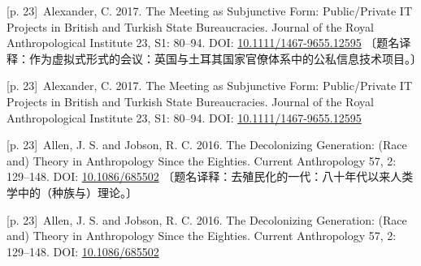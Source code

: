 \documentclass[10pt,a4paper]{article}
\begin{document}
\noindent\begin{minipage}{\textwidth}\begin{minipage}[t]{\dimexpr.5\textwidth-4mm\relax}\noindent\begin{minipage}[t]{\linewidth}{\scriptsize\color{gray} [p. 23]}\ Alexander, C. 2017. The Meeting as Subjunctive Form: Public/Private IT Projects in British and Turkish State Bureaucracies. Journal of the Royal Anthropological Institute 23, S1: 80–94. DOI: \url{10.1111/1467-9655.12595} 〔题名译释：作为虚拟式形式的会议：英国与土耳其国家官僚体系中的公私信息技术项目。〕\par\end{minipage}\par\end{minipage}\hfill\begin{minipage}[t]{\dimexpr.5\textwidth-4mm\relax}\noindent\begin{minipage}[t]{\linewidth}{\scriptsize\color{gray} [p. 23]}\ Alexander, C. 2017. The Meeting as Subjunctive Form: Public/Private IT Projects in British and Turkish State Bureaucracies. Journal of the Royal Anthropological Institute 23, S1: 80–94. DOI: \url{10.1111/1467-9655.12595}\par\end{minipage}\par\end{minipage}\end{minipage}\par
\noindent\begin{minipage}{\textwidth}\begin{minipage}[t]{\dimexpr.5\textwidth-4mm\relax}\noindent\begin{minipage}[t]{\linewidth}{\scriptsize\color{gray} [p. 23]}\ Allen, J. S. and Jobson, R. C. 2016. The Decolonizing Generation: (Race and) Theory in Anthropology Since the Eighties. Current Anthropology 57, 2: 129–148. DOI: \url{10.1086/685502} 〔题名译释：去殖民化的一代：八十年代以来人类学中的（种族与）理论。〕\par\end{minipage}\par\end{minipage}\hfill\begin{minipage}[t]{\dimexpr.5\textwidth-4mm\relax}\noindent\begin{minipage}[t]{\linewidth}{\scriptsize\color{gray} [p. 23]}\ Allen, J. S. and Jobson, R. C. 2016. The Decolonizing Generation: (Race and) Theory in Anthropology Since the Eighties. Current Anthropology 57, 2: 129–148. DOI: \url{10.1086/685502}\par\end{minipage}\par\end{minipage}\end{minipage}\par
\end{document}
